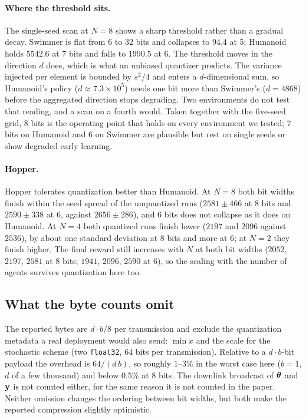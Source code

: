 \paragraph{Where the threshold sits.} The single-seed scan at $N=8$ shows
a sharp threshold rather than a gradual decay. Swimmer is flat from 6 to 32
bits and collapses to $94.4$ at 5; Humanoid holds $5542.6$ at 7 bits and falls
to $1990.5$ at 6. The threshold moves in the direction $d$ does, which is what
an unbiased quantizer predicts. The variance injected per element is bounded by
$s^2/4$ and enters a $d$-dimensional sum, so Humanoid's policy
($d \approx 7.3\times10^{5}$) needs one bit more than Swimmer's
($d = \num{4868}$) before the aggregated direction stops degrading. Two
environments do not test that reading, and a scan on a fourth would. Taken
together with the five-seed grid, 8 bits is the operating point that holds on
every environment we tested; 7 bits on Humanoid and 6 on Swimmer are
plausible but rest on single seeds or show degraded early learning.

\paragraph{Hopper.} Hopper tolerates quantization better than Humanoid. At
$N=8$ both bit widths finish within the seed spread of the unquantized runs
($2581 \pm 466$ at 8 bits and $2590 \pm 338$ at 6, against $2656 \pm 286$),
and 6 bits does not collapse as it does on Humanoid. At $N=4$ both quantized
runs finish lower ($2197$ and $2096$ against $2536$), by about one standard
deviation at 8 bits and more at 6; at $N=2$ they finish higher. The final
reward still increases with $N$ at both bit widths ($2052$, $2197$, $2581$ at
8 bits; $1941$, $2096$, $2590$ at 6), so the scaling with the number of agents
survives quantization here too.

\subsection{What the byte counts omit}

The reported bytes are $d \cdot b / 8$ per transmission and exclude the
quantization metadata a real deployment would also send: $\min x$ and the scale
for the stochastic scheme (two \texttt{float32}, 64 bits per transmission).
Relative to a $d \cdot b$-bit payload the
overhead is $64/(d\,b)$, so roughly $1$--$3\%$ in the worst case here ($b=1$, $d$
of a few thousand) and below $0.5\%$ at 8 bits. The downlink broadcast of
$\boldsymbol{\theta}$ and $\mathbf{y}$ is not counted either, for the same reason it is not counted
in the paper. Neither omission changes the ordering between bit widths, but
both make the reported compression slightly optimistic.

